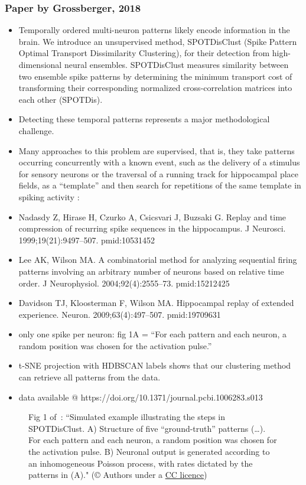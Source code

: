\documentclass[brainsci, %
               review,submit,pdftex,moreauthors]{Definitions/mdpi}
\begin{document}
\subsubsection{Paper by Grossberger, 2018~\citep{grossberger_unsupervised_2018}}
\begin{itemize}
 \item
  Temporally ordered multi-neuron patterns likely encode information in the brain. We introduce an unsupervised method, SPOTDisClust (Spike Pattern Optimal Transport Dissimilarity Clustering), for their detection from high-dimensional neural ensembles. SPOTDisClust measures similarity between two ensemble spike patterns by determining the minimum transport cost of transforming their corresponding normalized cross-correlation matrices into each other (SPOTDis).
\item
  Detecting these temporal patterns represents a major methodological challenge.
\item
  Many approaches to this problem are supervised, that is, they take patterns occurring concurrently with a known event, such as the delivery of a stimulus for sensory neurons or the traversal of a running track for hippocampal place fields, as a ``template'' and then search for repetitions of the same template in spiking activity :
\item
  Nadasdy Z, Hirase H, Czurko A, Csicsvari J, Buzsaki G. Replay and time compression of recurring spike sequences in the hippocampus. J Neurosci. 1999;19(21):9497--507. pmid:10531452
\item
  Lee AK, Wilson MA. A combinatorial method for analyzing sequential firing patterns involving an arbitrary number of neurons based on relative time order. J Neurophysiol. 2004;92(4):2555--73. pmid:15212425
\item
  Davidson TJ, Kloosterman F, Wilson MA. Hippocampal replay of extended experience. Neuron. 2009;63(4):497--507. pmid:19709631
\item
  only one spike per neuron: fig 1A = ``For each pattern and each neuron, a random position was chosen for the activation pulse.''
\item
  t-SNE projection with HDBSCAN labels shows that our clustering method can retrieve all patterns from the data.
\item
  data available @ https://doi.org/10.1371/journal.pcbi.1006283.s013
\end{itemize}

\begin{figure}
\centering
\caption{Fig 1 of~\citep{grossberger_unsupervised_2018}: ``Simulated example illustrating the steps in SPOTDisClust. A) Structure of five ``ground-truth'' patterns (\ldots). For each pattern and each neuron, a random position was chosen for the activation pulse. B) Neuronal output is generated according to an inhomogeneous Poisson process, with rates dictated by the patterns in (A)." (© Authors under a \href{https://journals.plos.org/ploscompbiol/article?id=10.1371/journal.pcbi.1006283}{CC licence})}\label{fig:G2018-1}
\end{figure}
\end{document}
